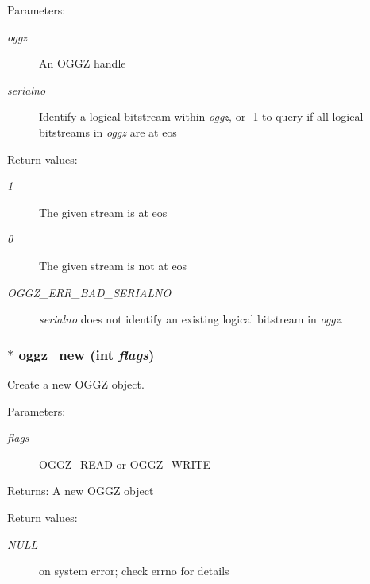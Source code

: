 \begin{Desc}
\item[Parameters:]
\begin{description}
\item[{\em oggz}]An OGGZ handle \item[{\em serialno}]Identify a logical bitstream within {\em oggz\/}, or -1 to query if all logical bitstreams in {\em oggz\/} are at eos \end{description}
\end{Desc}
\begin{Desc}
\item[Return values:]
\begin{description}
\item[{\em 1}]The given stream is at eos \item[{\em 0}]The given stream is not at eos \item[{\em OGGZ\_\-ERR\_\-BAD\_\-SERIALNO}]{\em serialno\/} does not identify an existing logical bitstream in {\em oggz\/}. \end{description}
\end{Desc}
\subsubsection{$\ast$ oggz\_\-new (int {\em flags})}\label{oggz_8h_a4}


Create a new OGGZ object. 

\begin{Desc}
\item[Parameters:]
\begin{description}
\item[{\em flags}]OGGZ\_\-READ or OGGZ\_\-WRITE \end{description}
\end{Desc}
\begin{Desc}
\item[Returns:]A new OGGZ object \end{Desc}
\begin{Desc}
\item[Return values:]
\begin{description}
\item[{\em NULL}]on system error; check errno for details \end{description}
\end{Desc}
